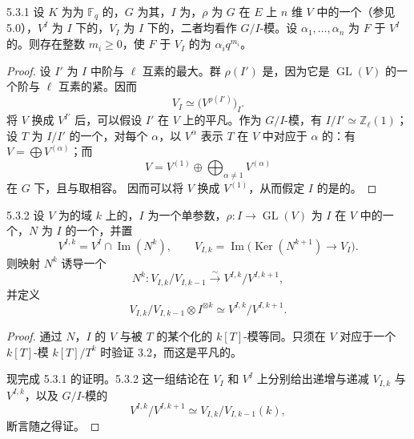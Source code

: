 \begin{SGAresult}{}{5.3.1}
设 $K$ 为为 $\mathbb F_q$ 的，$G$ 为其，$I$ 为，$\rho$ 为 $G$ 在 $E$ 上 $n$ 维 $V$ 中的一个（参见 5.0），$V^I$ 为 $I$ 下的，$V_I$ 为 $I$ 下的，二者均看作 $G/I$-模。设 $\alpha_1,\ldots,\alpha_n$ 为 $F$ 于 $V^I$ 的。则存在整数 $m_i\geq0$，使 $F$ 于 $V_I$ 的为 $\alpha_iq^{m_i}$。
\end{SGAresult}
\begin{proof}
设 $I'$ 为 $I$ 中阶与 $\ell$ 互素的最大。群 $\rho(I')$ 是，因为它是 $\operatorname{GL}(V)$ 的一个阶与 $\ell$ 互素的紧。因而
\[
V_I\simeq\bigl(V^{\rho(I')}\bigr)_I.
\]
将 $V$ 换成 $V^{I'}$ 后，可以假设 $I'$ 在 $V$ 上的平凡。作为 $G/I$-模，有 $I/I'\simeq\mathbb Z_\ell(1)$；设 $T$ 为 $I/I'$ 的一个，对每个 $\alpha$，以 $V^\alpha$ 表示 $T$ 在 $V$ 中对应于 $\alpha$ 的：有 $V=\bigoplus V^{(\alpha)}$；而
\[
V=V^{(1)}\oplus\bigoplus_{\alpha\ne1}V^{(\alpha)}
\]
在 $G$ 下，且与取相容。
因而可以将 $V$ 换成 $V^{(1)}$，从而假定 $I$ 的是的。
\end{proof}

\begin{SGAresult}{}{5.3.2}
设 $V$ 为的域 $k$ 上的，$I$ 为一个单参数，$\rho:I\to\operatorname{GL}(V)$ 为 $I$ 在 $V$ 中的一个，$N$ 为 $I$ 的一个，并置
\[
V^{I,k}=V^I\cap\operatorname{Im}(N^k),\qquad
V_{I,k}=\operatorname{Im}\bigl(\operatorname{Ker}(N^{k+1})\longrightarrow V_I\bigr).
\]
则映射 $N^k$ 诱导一个
\[
N^k:V_{I,k}/V_{I,k-1}\xrightarrow{\sim}V^{I,k}/V^{I,k+1},
\]
并定义
\[
V_{I,k}/V_{I,k-1}\otimes I^{\otimes k}\simeq V^{I,k}/V^{I,k+1}.
\]
\end{SGAresult}
\begin{proof}
通过 $N$，$I$ 的 $V$ 与被 $T$ 的某个化的 $k[T]$-模等同。只须在 $V$ 对应于一个 $k[T]$-模 $k[T]/T^k$ 时验证 3.2，而这是平凡的。

现完成 5.3.1 的证明。5.3.2 这一组结论在 $V_I$ 和 $V^I$ 上分别给出递增与递减 $V_{I,k}$ 与 $V^{I,k}$，以及 $G/I$-模的
\[
V^{I,k}/V^{I,k+1}\simeq V_{I,k}/V_{I,k-1}(k),
\]
断言随之得证。
\end{proof}

